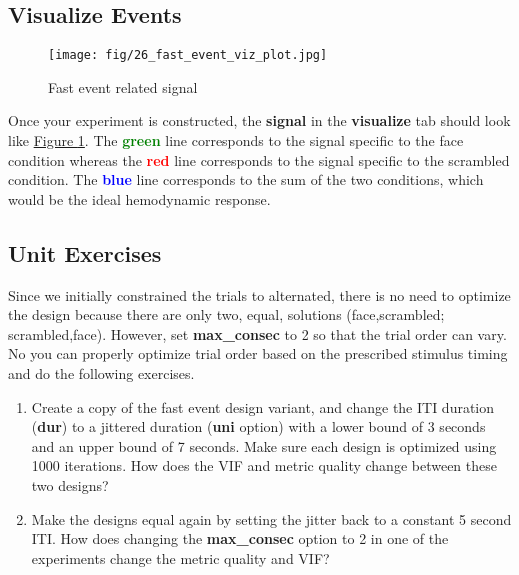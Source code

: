 \documentclass[10pt]{article}
\begin{document}
	\subsection{Visualize Events}
	\label{subsec:u6viz}
		\begin{figure}[ht]
			\centering
			\texttt{[image: fig/26\_fast\_event\_viz\_plot.jpg]}
			\caption{Fast event related signal}
			\label{fig:fast_event_signal}
		\end{figure}
		Once your experiment is constructed, the \textbf{signal} in the \textbf{visualize} tab should look like \hyperref[fig:fast_event_signal]{Figure \ref{fig:fast_event_signal}}.
		The \textcolor{green}{\textbf{green}} line corresponds to the signal specific to the face condition whereas the \textcolor{red}{\textbf{red}} line corresponds to the signal specific to the scrambled condition.
		The \textcolor{blue}{\textbf{blue}} line corresponds to the sum of the two conditions, which would be the ideal hemodynamic response.
	\newpage

	\subsection{Unit Exercises}
	\label{subsec:u6exercises}
		Since we initially constrained the trials to alternated, there is no need to optimize the design because there are only two, equal, solutions (face,scrambled; scrambled,face).
		However, set \textbf{max\_consec} to 2 so that the trial order can vary.
		No you can properly optimize trial order based on the prescribed stimulus timing and do the following exercises.
		\begin{enumerate}
			\item Create a copy of the fast event design variant, and change the ITI duration (\textbf{dur}) to a jittered duration (\textbf{uni} option) with a lower bound of 3 seconds and an upper bound of 7 seconds.
			Make sure each design is optimized using 1000 iterations.
			How does the VIF and metric quality change between these two designs?
			\item Make the designs equal again by setting the jitter back to a constant 5 second ITI.
			How does changing the \textbf{max\_consec} option to 2 in one of the experiments change the metric quality and VIF?
		\end{enumerate}

\end{document}
